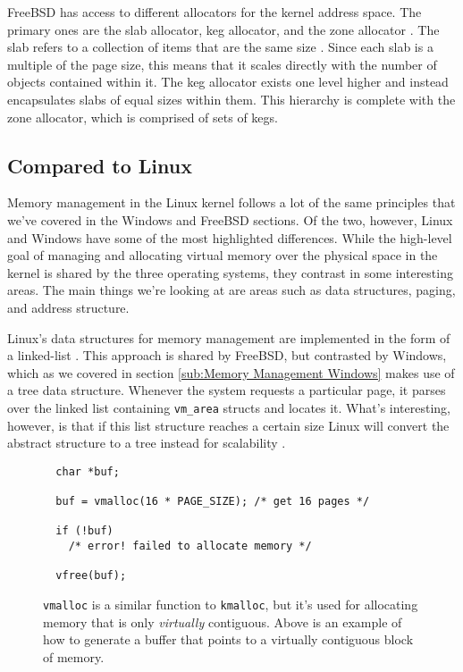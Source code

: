 \documentclass[10pt,draftclsnofoot,onecolumn]{IEEEtran}
\begin{document}
\par FreeBSD has access to different allocators for the kernel address space.
The primary ones are the slab allocator, keg allocator, and the zone allocator \cite{bsd:1}.
The slab refers to a collection of items that are the same size \cite{bsd:1}.
Since each slab is a multiple of the page size, this means that it scales directly with the number of objects contained within it.
The keg allocator exists one level higher and instead encapsulates slabs of equal sizes within them.
This hierarchy is complete with the zone allocator, which is comprised of sets of kegs.

\subsection{Compared to Linux}
\label{sub:Memory Management Linux}
\par Memory management in the Linux kernel follows a lot of the same principles that we've covered in the Windows and FreeBSD sections.
Of the two, however, Linux and Windows have some of the most highlighted differences.
While the high-level goal of managing and allocating virtual memory over the physical space in the kernel is shared by the three operating systems, they contrast in some interesting areas.
The main things we're looking at are areas such as data structures, paging, and address structure.

\par Linux's data structures for memory management are implemented in the form of a linked-list \cite{linux:1}.
This approach is shared by FreeBSD, but contrasted by Windows, which as we covered in section \ref{sub:Memory Management Windows} makes use of a tree data structure.
Whenever the system requests a particular page, it parses over the linked list containing \texttt{vm\_area} structs and locates it.
What's interesting, however, is that if this list structure reaches a certain size Linux will convert the abstract structure to a tree instead for scalability \cite{linux:1}.

\begin{figure}[h]
\begin{lstlisting}
  char *buf;

  buf = vmalloc(16 * PAGE_SIZE); /* get 16 pages */

  if (!buf)
    /* error! failed to allocate memory */

  vfree(buf);
\end{lstlisting}
\centering
\captionsetup{justification=centering}
\caption{
  \texttt{vmalloc} is a similar function to \texttt{kmalloc}, but it's used for allocating memory that is only \textit{virtually} contiguous.
  Above is an example of how to generate a buffer that points to a virtually contiguous block of memory.
}
\label{code:vmalloc}
\end{figure}
\end{document}
